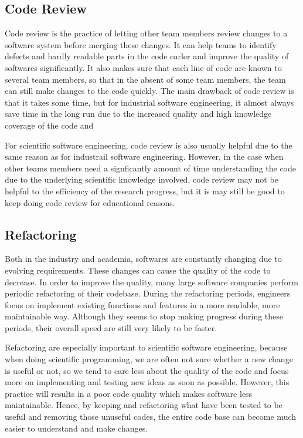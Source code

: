 \subsection{Code Review}
Code review is the practice of letting other team members review changes to a software system before merging these changes.
It can help teams to identify defects and hardly readable parts in the code earler and improve the quality of softwares significantly.
It also makes sure that each line of code are known to several team members, so that in the absent of some team members, the team can still make changes to the code quickly.
The main drawback of code review is that it takes some time, but for industrial software engineering, it almost always save time in the long run due to the increased quality and high knowledge coverage of the code and 

For scientific software engineering, code review is also usually helpful due to the same reason as for industrail software engineering.
However, in the case when other teams members need a signficantly amount of time understanding the code due to the underlying scientific knowledge involved, code review may not be helpful to the efficiency of the research progress, but it is may still be good to keep doing code review for educational reasons.

\subsection{Refactoring}
Both in the industry and academia, softwares are constantly changing due to evolving requirements.
These changes can cause the quality of the code to decrease.
In order to improve the quality, many large software companies perform periodic refactoring of their codebase.
During the refactoring periods, engineers focus on implement existing functions and features in a more readable, more maintainable way.
Although they seems to stop making progress during these periods, their overall speed are still very likely to be faster.

Refactoring are especially important to scientific software engineering, because when doing scientific programming, we are often not sure whether a new change is useful or not, so we tend to care less about the quality of the code and focus more on implementing and testing new ideas as soon as possible.
However, this practice will results in a poor code quality which makes software less maintainable.
Hence, by keeping and refactoring what have been tested to be useful and removing those unuseful codes, the entire code base can become much easier to understand and make changes.

